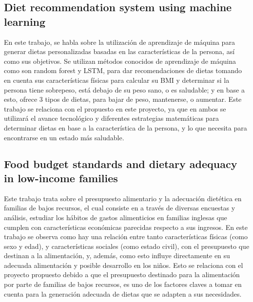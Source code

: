 \subsection{Diet recommendation system using machine learning}
En este trabajo, se habla sobre la utilizaci\'on de aprendizaje de m\'aquina para generar dietas personalizadas basadas en las caracter\'isticas de la persona, as\'i como sus objetivos. Se utilizan m\'etodos conocidos de aprendizaje de m\'aquina como son random forest y LSTM, para dar recomendaciones de dietas tomando en cuenta sus caracter\'isticas f\'isicas para calcular su BMI y determinar si la persona tiene sobrepeso, est\'a debajo de su peso sano, o es saludable; y en base a esto, ofrece 3 tipos de dietas, para bajar de peso, mantenerse, o aumentar. Este trabajo se relaciona con el propuesto en este proyecto, ya que en ambos se utilizar\'a el avance tecnol\'ogico y diferentes estrategias matem\'aticas para determinar dietas en base a la caracter\'istica de la persona, y lo que necesita para encontrarse en un estado m\'as saludable.\cite{DietRecommendation}


\subsection{Food budget standards and dietary adequacy in low-income families}
Este trabajo trata sobre el presupuesto alimentario y la adecuaci\'on diet\'etica en familias de bajos recursos, el cual consiste en a trav\'es de diversas encuestas y an\'alisis, estudiar los h\'abitos de gastos alimenticios en familias inglesas que cumplen con caracter\'isticas econ\'omicas parecidas respecto a sus ingresos. En este trabajo se observa como hay una relaci\'on entre tanto caracter\'isticas f\'isicas (como sexo y edad), y caracter\'isticas sociales (como estado civil), con el presupuesto que destinan a la alimentaci\'on, y, adem\'as, como esto influye directamente en su adecuada alimentaci\'on y posible desarrollo en los ni\~{n}os. Esto se relaciona con el proyecto propuesto debido a que el presupuesto destinado para la alimentaci\'on por parte de familias de bajos recursos, es uno de los factores claves a tomar en cuenta para la generaci\'on adecuada de dietas que se adapten a sus necesidades.\cite{leeDietPlanningMachine2021}


